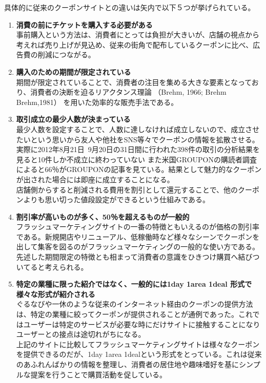 具体的に従来のクーポンサイトとの違いは矢内で以下５つが挙げられている。
\begin{enumerate}
	\item \textbf{消費の前にチケットを購入する必要がある}
	\\事前購入という方法は、消費者にとっては負担が大きいが、店舗の視点から考えれば売り上げが見込め、従来の街角で配布しているクーポンに比べ、広告費の削減につながる。
	\item \textbf{購入のための期間が限定されている}
	\\期間が限定されていることで、消費者の注目を集める大きな要素となっており、消費者の決断を迫るリアクタンス理論 （Brehm, 1966; Brehm  Brehm,1981） を用いた効率的な販売手法である。
	\item\textbf{取引成立の最少人数が決まっている}
	\\最少人数を設定することで、人数に達しなければ成立しないので、成立させたいという思いから友人や他社をSNS等々でクーポンの情報を拡散させる。実際に2012年8月21日~9月20日の31日間に行われた398件の取引の分析結果を見ると10件しか不成立に終わっていない \cite{yauchi}
	また米国GROUPONの購読者調査によると66％がGROUPONの記事を見ている。結果として魅力的なクーポンが出された場合には即座に成立することになる。
	\\店舗側からすると削減される費用を割引として還元することで、他のクーポンよりも思い切った値段設定ができるという仕組みである。
	\item \textbf{割引率が高いものが多く、50％を超えるものが一般的}
	\\フラッシュマーケティングサイトの一番の特徴ともいえるのが価格の割引率である。新規開店やリニューアル、低稼働時など様々なシーンでクーポンを出して集客を図るのがフラッシュマーケティングの一般的な使い方である。
	\\先述した期間限定の特徴とも相まって消費者の意識をひきつけ購買へ結びついてると考えられる。
	\item \textbf{特定の業種に限った紹介ではなく、一般的には1day 1area 1deal 形式で様々な形式が紹介される}
	\\ぐるなびや一休のような従来のインターネット経由のクーポンの提供方法は、特定の業種に絞ってクーポンが提供されることが通例であった。これではユーザーは特定のサービスが必要な時にだけサイトに接触することになりユーザーとの接点は途切れがちになる。
	\\上記のサイトに比較してフラッシュマーケティングサイトは様々なクーポンを提供できるのだが、1day 1area 1dealという形式をとっている。これは従来のあふれんばかりの情報を整理し、消費者の居住地や趣味嗜好を基にシンプルな提案を行うことで購買活動を促している。
\end{enumerate}

